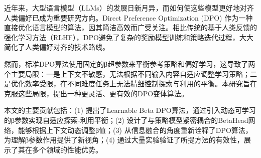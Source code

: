 
近年来，大型语言模型（LLMs）的发展日新月异，而如何使这些模型更好地对齐人类偏好已成为重要研究方向。Direct Preference Optimization (DPO) \cite{rafailov2023direct}作为一种直接优化语言模型的算法，因其简洁高效而广受关注。相比传统的基于人类反馈的强化学习方法（RLHF）\cite{ouyang2022training}，DPO避免了复杂的奖励模型训练和策略迭代过程，大大简化了人类偏好对齐的技术路线。

然而，标准DPO算法使用固定的β超参数来平衡参考策略和偏好学习，这导致了两个主要局限：一是上下文不敏感，无法根据不同输入内容自适应调整学习策略；二是优化效率受限，在不同难度任务上无法精细控制探索与利用的平衡。本研究旨在克服这些局限，提出一种更灵活、更有效的DPO变体算法。

本文的主要贡献包括：(1) 提出了Learnable Beta DPO算法，通过引入动态可学习的β参数实现自适应探索-利用平衡；(2) 设计了与策略模型紧密耦合的BetaHead网络，能够根据上下文动态调整β值；(3) 从信息融合的角度重新诠释了DPO算法，为理解β参数作用提供了新视角；(4) 通过大量实验验证了所提方法的有效性，展示了其在多个领域的性能优势。 